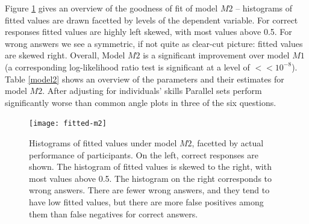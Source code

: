 Figure \ref{fitted.m2} gives an overview of the goodness of fit of model $M2$ -- histograms of fitted values are drawn facetted by levels of the dependent variable. For correct responses fitted values are highly left skewed, with most values  above 0.5. For wrong answers we see a symmetric, if not quite as clear-cut picture: fitted values are skewed right. 
Overall, Model $M2$ is a significant improvement over model $M1$ (a corresponding log-likelihood ratio test is significant at a level of $<\!\!\!< 10^{-8}$).
Table \ref{model2} shows an overview of the  parameters and their estimates for model $M2$. After adjusting for individuals' skills Parallel sets perform significantly worse than common angle plots in three of the six questions. 

\begin{figure}
\texttt{[image: fitted-m2]}
\caption{\label{fitted.m2} Histograms of fitted values under model $M2$, facetted by actual performance of participants. On the left, correct responses are shown. The histogram of fitted values is skewed to the right, with most values above 0.5. The histogram on the right corresponds to wrong answers. There are fewer wrong answers, and they tend to have low fitted values, but there are more false positives among them than false negatives for correct answers. }
\end{figure}

